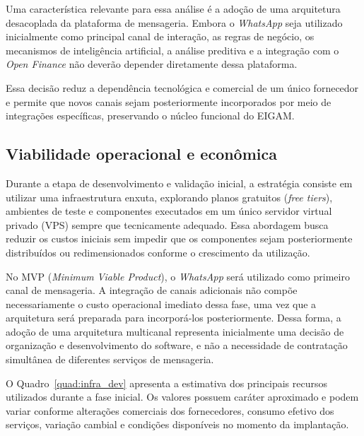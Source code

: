 Uma característica relevante para essa análise é a adoção de uma arquitetura desacoplada da plataforma de mensageria. Embora o \textit{WhatsApp} seja utilizado inicialmente como principal canal de interação, as regras de negócio, os mecanismos de inteligência artificial, a análise preditiva e a integração com o \textit{Open Finance} não deverão depender diretamente dessa plataforma.

Essa decisão reduz a dependência tecnológica e comercial de um único fornecedor e permite que novos canais sejam posteriormente incorporados por meio de integrações específicas, preservando o núcleo funcional do EIGAM.


\subsection{Viabilidade operacional e econômica}

Durante a etapa de desenvolvimento e validação inicial, a estratégia consiste em utilizar uma infraestrutura enxuta, explorando planos gratuitos (\textit{free tiers}), ambientes de teste e componentes executados em um único servidor virtual privado (VPS) sempre que tecnicamente adequado. Essa abordagem busca reduzir os custos iniciais sem impedir que os componentes sejam posteriormente distribuídos ou redimensionados conforme o crescimento da utilização.

No MVP (\textit{Minimum Viable Product}), o \textit{WhatsApp} será utilizado como primeiro canal de mensageria. A integração de canais adicionais não compõe necessariamente o custo operacional imediato dessa fase, uma vez que a arquitetura será preparada para incorporá-los posteriormente. Dessa forma, a adoção de uma arquitetura multicanal representa inicialmente uma decisão de organização e desenvolvimento do software, e não a necessidade de contratação simultânea de diferentes serviços de mensageria.

O Quadro~\ref{quad:infra_dev} apresenta a estimativa dos principais recursos utilizados durante a fase inicial. Os valores possuem caráter aproximado e podem variar conforme alterações comerciais dos fornecedores, consumo efetivo dos serviços, variação cambial e condições disponíveis no momento da implantação.

